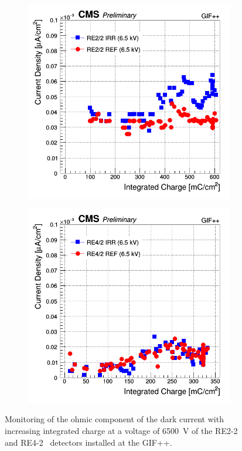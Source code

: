 	\begin{figure}[H]
    	\begin{subfigure}{0.5\linewidth}
    		\centering
			\includegraphics[width = \linewidth]{fig/chapt5/RE2-2-Dark-Current-vs-Time-6500.png}
        	\caption{\label{fig:GIFpp-Ohmic-mon:A}}
    	\end{subfigure}
    	\begin{subfigure}{0.5\linewidth}
			\centering
    		\includegraphics[width = \linewidth]{fig/chapt5/RE4-2-Dark-Current-vs-Time-6500.png}
        	\caption{\label{fig:GIFpp-Ohmic-mon:B}}
    	\end{subfigure}
		\caption{\label{fig:GIFpp-Ohmic-mon} Monitoring of the ohmic component of the dark current with increasing integrated charge at a voltage of \SI{6500}{V} of the RE2-2~ and RE4-2~ detectors installed at the GIF++.}
	\end{figure}
	
